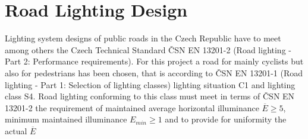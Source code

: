 \section{Road Lighting Design}
Lighting system designs of public roads in the Czech Republic have to meet among others the Czech Technical Standard \v{C}SN EN 13201-2 (Road lighting - Part 2: Performance requirements). For this project a road for mainly cyclists but also for pedestrians has been chosen, that is according to ČSN EN 13201-1 (Road lighting - Part 1: Selection of lighting classes) lighting situation C1 and lighting class S4. Road lighting conforming to this class must meet in terms of ČSN EN 13201-2 the requirement of maintained average horizontal illuminance $\overline{E}\geq 5$, minimum maintained illuminance $E_{min}\geq 1$ and to provide for uniformity the actual $\overline{E}$ 